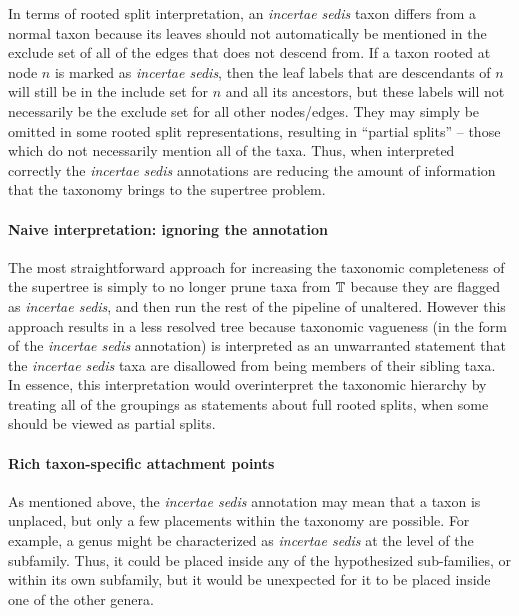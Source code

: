 \documentclass[english]{article}
\begin{document}
In terms of rooted split interpretation, an \emph{incertae sedis}
taxon differs from a normal taxon because its leaves should not
automatically be mentioned in the exclude set of all of the edges that
does not descend from.
If a taxon rooted at node $n$ is marked as
\emph{incertae sedis}, then the leaf labels that are descendants of
$n$ will still be in the include set for $n$ and all its ancestors,
but these labels will not necessarily be the exclude set for all other
nodes/edges.
They may simply be omitted in some rooted split
representations, resulting in ``partial splits'' -- those which
do not necessarily mention all of the taxa.
Thus, when interpreted correctly the \emph{incertae sedis} annotations
are reducing the amount of information that the taxonomy brings to
the supertree problem.


\paragraph{Naive interpretation: ignoring the annotation}

The most straightforward approach for increasing the taxonomic
completeness of the supertree is simply to no longer prune taxa from
$\mbox{\ensuremath{\mathbb{T}}}$ because they are flagged as \emph{incertae sedis}, and
then run the rest of the pipeline of \citet{redelings2017supertree}
unaltered.
However this approach results in a less resolved tree
because taxonomic vagueness (in the form of the \emph{incertae sedis}
annotation) is interpreted as an unwarranted statement that the
\emph{incertae sedis} taxa are disallowed from being members of their
sibling taxa.
In essence, this interpretation would overinterpret the taxonomic
    hierarchy by treating all of the groupings as statements about
    full rooted splits, when some should be viewed as partial splits.


\paragraph{Rich taxon-specific attachment points}

As mentioned above, the \emph{incertae sedis} annotation may mean that a taxon is
unplaced, but only a few placements within the taxonomy are possible.
For example, a genus might be characterized as \emph{incertae sedis}
at the level of the subfamily.
Thus, it could be placed inside any of the
hypothesized sub-families, or within its own subfamily, but it would
be unexpected for it to be placed inside one of the other genera.
\end{document}
